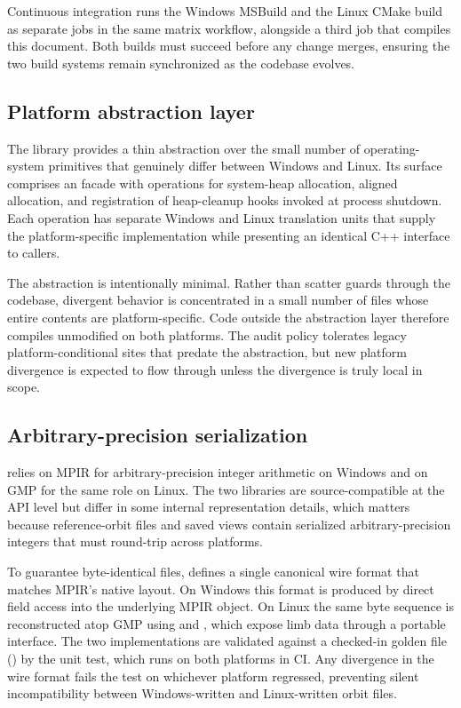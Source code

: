 Continuous integration runs the Windows MSBuild and the Linux CMake build as
separate jobs in the same matrix workflow, alongside a third job that compiles
this document.  Both builds must succeed before any change merges, ensuring the
two build systems remain synchronized as the codebase evolves.

\subsection{Platform abstraction layer}
\label{subsec:platform-abstraction}

The  library provides a thin abstraction over the
small number of operating-system primitives that genuinely differ between
Windows and Linux.  Its surface comprises an  facade with
operations for system-heap allocation, aligned allocation, and registration of
heap-cleanup hooks invoked at process shutdown.  Each operation has separate
Windows and Linux translation units that supply the platform-specific
implementation while presenting an identical C++ interface to callers.

The abstraction is intentionally minimal.  Rather than scatter
 guards through the codebase, divergent behavior is
concentrated in a small number of files whose entire contents are
platform-specific.  Code outside the abstraction layer therefore compiles
unmodified on both platforms.  The audit policy tolerates legacy
platform-conditional sites that predate the abstraction, but new platform
divergence is expected to flow through  unless the
divergence is truly local in scope.

\subsection{Arbitrary-precision serialization}
\label{subsec:mpir-portability}

\FractalShark{} relies on MPIR for arbitrary-precision integer arithmetic on
Windows and on GMP for the same role on Linux.  The two libraries are
source-compatible at the API level but differ in some internal representation
details, which matters because reference-orbit files and saved views contain
serialized arbitrary-precision integers that must round-trip across platforms.

To guarantee byte-identical files, \FractalShark{} defines a single canonical
wire format that matches MPIR's native  layout.  On
Windows this format is produced by direct field access into the underlying
MPIR object.  On Linux the same byte sequence is reconstructed atop GMP using
 and , which expose limb data through a
portable interface.  The two implementations are validated against a checked-in
golden file () by the 
unit test, which runs on both platforms in CI.  Any divergence in the wire
format fails the test on whichever platform regressed, preventing silent
incompatibility between Windows-written and Linux-written orbit files.

